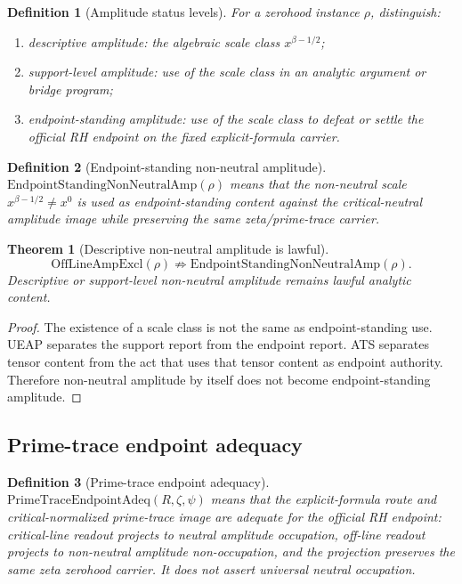 \documentclass[11pt]{article}
\newtheorem{definition}{Definition}[section]
\newtheorem{theorem}{Theorem}[section]
\newcommand{\OffAmpExcl}{\mathrm{OffLineAmpExcl}}
\newcommand{\AmpStand}{\mathrm{EndpointStandingNonNeutralAmp}}
\newcommand{\PrimeTraceAdeq}{\mathrm{PrimeTraceEndpointAdeq}}
\begin{document}
\begin{definition}[Amplitude status levels]
For a zerohood instance \(\rho\), distinguish:
\begin{enumerate}
\item \emph{descriptive amplitude}: the algebraic scale class \(x^{\beta-1/2}\);
\item \emph{support-level amplitude}: use of the scale class in an analytic argument or bridge program;
\item \emph{endpoint-standing amplitude}: use of the scale class to defeat or settle the official RH endpoint on the fixed explicit-formula carrier.
\end{enumerate}
\end{definition}

\begin{definition}[Endpoint-standing non-neutral amplitude]
\(\AmpStand(\rho)\) means that the non-neutral scale \(x^{\beta-1/2}\ne x^0\) is used as endpoint-standing content against the critical-neutral amplitude image while preserving the same zeta/prime-trace carrier.
\end{definition}

\begin{theorem}[Descriptive non-neutral amplitude is lawful]
\[
\OffAmpExcl(\rho)\not\Rightarrow \AmpStand(\rho).
\]
Descriptive or support-level non-neutral amplitude remains lawful analytic content.
\end{theorem}

\begin{proof}
The existence of a scale class is not the same as endpoint-standing use.  UEAP separates the support report from the endpoint report.  ATS separates tensor content from the act that uses that tensor content as endpoint authority.  Therefore non-neutral amplitude by itself does not become endpoint-standing amplitude.
\end{proof}

\subsection{Prime-trace endpoint adequacy}

\begin{definition}[Prime-trace endpoint adequacy]
\(\PrimeTraceAdeq(R,\zeta,\psi)\) means that the explicit-formula route and critical-normalized prime-trace image are adequate for the official RH endpoint: critical-line readout projects to neutral amplitude occupation, off-line readout projects to non-neutral amplitude non-occupation, and the projection preserves the same zeta zerohood carrier.  It does not assert universal neutral occupation.
\end{definition}
\end{document}
